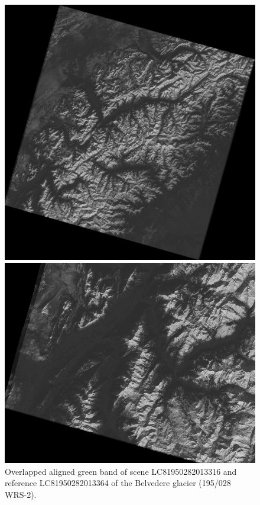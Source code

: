 \documentclass[11pt, a4paper]{report}
\begin{document}
	\begin{figure}[h]
		\centering
		\begin{minipage}{0.36\textwidth}
			\centering
			\includegraphics[width=\linewidth]{../images/aligned.png}
		\end{minipage}
		\begin{minipage}{0.45\textwidth}
			\centering
			\includegraphics[width=\linewidth]{../images/aligned_part.png}
		\end{minipage}
		\caption{Overlapped aligned green band of scene LC81950282013316 and reference LC81950282013364 of the Belvedere glacier (195/028 WRS-2).}
		\label{fig:aligned}
	\end{figure}
\end{document}
